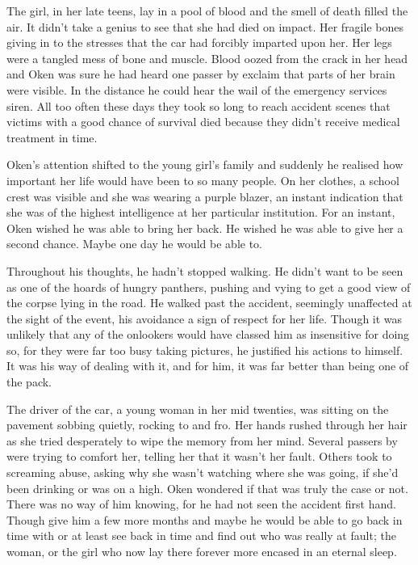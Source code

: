 The girl, in her late teens, lay in a pool of blood and the smell of death filled the air. It didn't take a genius to see that she had died on impact. Her fragile bones giving in to the stresses that the car had forcibly imparted upon her. Her legs were a tangled mess of bone and muscle. Blood oozed from the crack in her head and Oken was sure he had heard one passer by exclaim that parts of her brain were visible. In the distance he could hear the wail of the emergency services siren. All too often these days they took so long to reach accident scenes that victims with a good chance of survival died because they didn't receive medical treatment in time.

Oken's attention shifted to the young girl's family and suddenly he realised how important her life would have been to so many people. On her clothes, a school crest was visible and she was wearing a purple blazer, an instant indication that she was of the highest intelligence at her particular institution. For an instant, Oken wished he was able to bring her back. He wished he was able to give her a second chance. Maybe one day he would be able to.

Throughout his thoughts, he hadn't stopped walking. He didn't want to be seen as one of the hoards of hungry panthers, pushing and vying to get a good view of the corpse lying in the road. He walked past the accident, seemingly unaffected at the sight of the event, his avoidance a sign of respect for her life. Though it was unlikely that any of the onlookers would have classed him as insensitive for doing so, for they were far too busy taking pictures, he justified his actions to himself. It was his way of dealing with it, and for him, it was far better than being one of the pack.

The driver of the car, a young woman in her mid twenties, was sitting on the pavement sobbing quietly, rocking to and fro. Her hands rushed through her hair as she tried desperately to wipe the memory from her mind. Several passers by were trying to comfort her, telling her that it wasn't her fault. Others took to screaming abuse, asking why she wasn't watching where she was going, if she'd been drinking or was on a high. Oken wondered if that was truly the case or not. There was no way of him knowing, for he had not seen the accident first hand. Though give him a few more months and maybe he would be able to go back in time with or at least see back in time and find out who was really at fault; the woman, or the girl who now lay there forever more encased in an eternal sleep.

